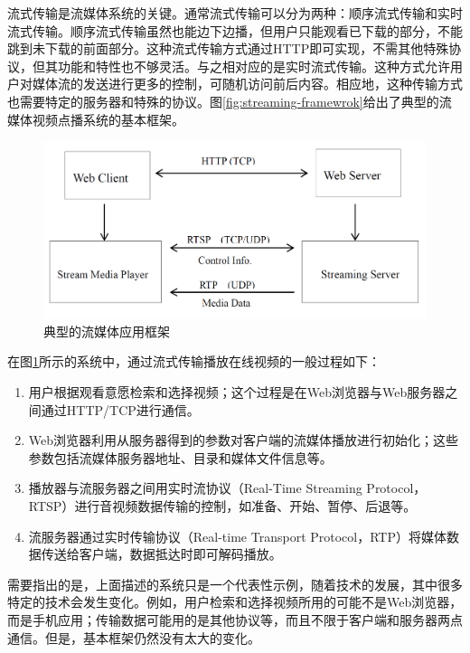 流式传输是流媒体系统的关键。通常流式传输可以分为两种：顺序流式传输和实时流式传输。顺序流式传输虽然也能边下边播，但用户只能观看已下载的部分，不能跳到未下载的前面部分。这种流式传输方式通过HTTP即可实现，不需其他特殊协议，但其功能和特性也不够灵活。与之相对应的是实时流式传输。这种方式允许用户对媒体流的发送进行更多的控制，可随机访问前后内容。相应地，这种传输方式也需要特定的服务器和特殊的协议。图\ref{fig:streaming-framewrok}给出了典型的流媒体视频点播系统的基本框架。

\begin{figure}[h]
	\centering
	\includegraphics[width = 1.0\linewidth]{figures/streaming-framework.png}
	\caption{典型的流媒体应用框架\label{fig:streaming-framework}}
\end{figure}

在图\ref{fig:streaming-framework}所示的系统中，通过流式传输播放在线视频的一般过程如下：
\begin{enumerate}
\item 用户根据观看意愿检索和选择视频；这个过程是在Web浏览器与Web服务器之间通过HTTP/TCP进行通信。
\item Web浏览器利用从服务器得到的参数对客户端的流媒体播放进行初始化；这些参数包括流媒体服务器地址、目录和媒体文件信息等。
\item 播放器与流服务器之间用实时流协议（Real-Time Streaming Protocol，RTSP）\supercite{RTSP}进行音视频数据传输的控制，如准备、开始、暂停、后退等。
\item 流服务器通过实时传输协议（Real-time Transport Protocol，RTP）\supercite{RTP}将媒体数据传送给客户端，数据抵达时即可解码播放。
\end{enumerate}

需要指出的是，上面描述的系统只是一个代表性示例，随着技术的发展，其中很多特定的技术会发生变化。例如，用户检索和选择视频所用的可能不是Web浏览器，而是手机应用；传输数据可能用的是其他协议等，而且不限于客户端和服务器两点通信。但是，基本框架仍然没有太大的变化。

